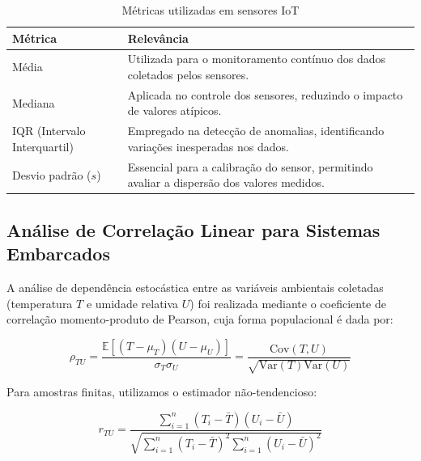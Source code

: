 \documentclass[12pt, a4paper]{article}
\begin{document}
\begin{table}[h]
    \centering
    \caption{Métricas utilizadas em sensores IoT}
    \label{tab:metricas_iot}
    \begin{tabular}{|p{4cm}|p{8cm}|}
        \toprule
        \textbf{Métrica} & \textbf{Relevância} \\
        \hline
        Média & Utilizada para o monitoramento contínuo dos dados coletados pelos sensores. \\
        \hline
        Mediana & Aplicada no controle dos sensores, reduzindo o impacto de valores atípicos. \\
        \hline
        IQR (Intervalo Interquartil) & Empregado na detecção de anomalias, identificando variações inesperadas nos dados. \\
        \hline
        Desvio padrão ($s$) & Essencial para a calibração do sensor, permitindo avaliar a dispersão dos valores medidos. \\
        \bottomrule
    \end{tabular}
\end{table}


\subsection{Análise de Correlação Linear para Sistemas Embarcados}
\label{subsec:correlacao}

A análise de dependência estocástica entre as variáveis ambientais coletadas (temperatura $T$ e umidade relativa $U$) foi realizada mediante o coeficiente de correlação momento-produto de Pearson, cuja forma populacional é dada por:

\begin{equation}
    \rho_{TU} = \frac{\mathbb{E}[(T - \mu_T)(U - \mu_U)]}{\sigma_T \sigma_U} = \frac{\text{Cov}(T,U)}{\sqrt{\text{Var}(T)\text{Var}(U)}}
\end{equation}

\noindent Para amostras finitas, utilizamos o estimador não-tendencioso:

\begin{equation}
    r_{TU} = \frac{\sum_{i=1}^n (T_i - \bar{T})(U_i - \bar{U})}{\sqrt{\sum_{i=1}^n (T_i - \bar{T})^2 \sum_{i=1}^n (U_i - \bar{U})^2}}
    \label{eq:pearson_amostral}
\end{equation}
\end{document}
